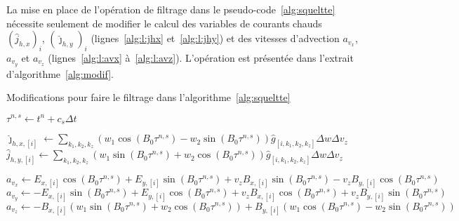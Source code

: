 La mise en place de l'opération de filtrage dans le pseudo-code~\ref{alg:squeltte} nécessite seulement de modifier le calcul des variables de courants chauds $\left(\hat{j}_{h,x}\right)_i$, $\left(\hat{\jmath}_{h,y}\right)_i$ (lignes~\ref{alg:l:jhx} et~\ref{alg:l:jhy}) et des vitesses d'advection $a_{v_x}$, $a_{v_y}$ et $a_{v_z}$ (lignes~\ref{alg:l:avx} à~\ref{alg:l:avz}). L'opération est présentée dans l'extrait d'algorithme~\ref{alg:modif}. 

\begin{algorithm}
  \caption{Modifications pour faire le filtrage dans l'algorithme~\ref{alg:squeltte}}
  \label{alg:modif}
  \begin{algorithmic}
    \State $\tau^{n,s} \gets t^n+c_s\Delta t$
  \end{algorithmic}
  \begin{algorithmic}[1]
    \State $\hat{\jmath}_{h,x,[i]} \gets \sum_{k_1,k_2,k_z} ( w_1\cos(B_0\tau^{n,s}) - w_2\sin(B_0\tau^{n,s}) ) \hat{g}_{[i,k_1,k_2,k_z]} \Delta w\Delta v_z$
    \State $\hat{j}_{h,y,[i]} \gets \sum_{k_1,k_2,k_z} ( w_1\sin(B_0\tau^{n,s}) + w_2\cos(B_0\tau^{n,s}) ) \hat{g}_{[i,k_1,k_2,k_z]} \Delta w\Delta v_z$
  \end{algorithmic}
  \vspace{0.1cm}
  \begin{algorithmic}[1]
    \State $a_{v_x} \gets E_{x,[i]}\cos(B_0\tau^{n,s}) + E_{y,[i]}\sin(B_0\tau^{n,s}) + v_zB_{x,[i]}\sin(B_0\tau^{n,s}) - v_zB_{y,[i]}\cos(B_0\tau^{n,s})$
    \State $a_{v_y} \gets -E_{x,[i]}\sin(B_0\tau^{n,s}) + E_{y,[i]}\cos(B_0\tau^{n,s}) + v_zB_{x,[i]}\cos(B_0\tau^{n,s}) + v_zB_{y,[i]}\sin(B_0\tau^{n,s})$
    \State $a_{v_z} \gets -B_{x,[i]}(w_1\sin(B_0\tau^{n,s}) + w_2\cos(B_0\tau^{n,s})) + B_{y,[i]}(w_1\cos(B_0\tau^{n,s}) - w_2\sin(B_0\tau^{n,s}) )$
  \end{algorithmic}
\end{algorithm}

